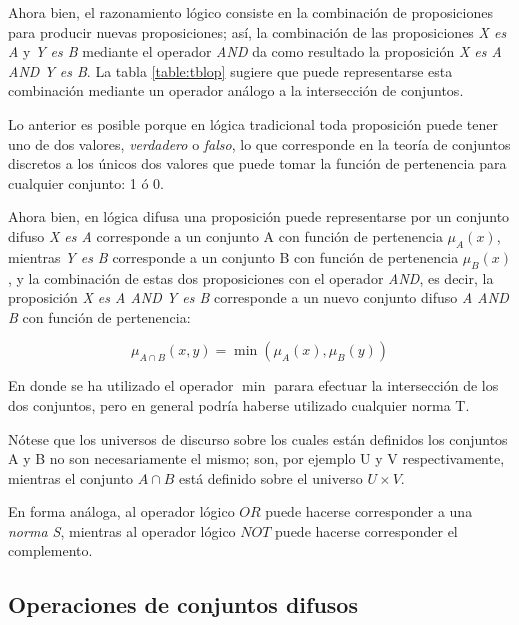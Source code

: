 Ahora bien, el razonamiento lógico consiste en la combinación de proposiciones para producir nuevas proposiciones; así, la combinación de las proposiciones \textit{X es A} y  \textit{Y es B} mediante el operador \textit{AND} da como resultado la proposición \textit{X es A AND Y es B}. La tabla \ref{table:tblop} sugiere que puede representarse esta combinación mediante un operador análogo a la intersección de conjuntos.

Lo anterior es posible porque en lógica tradicional toda proposición puede tener uno de dos valores, \textit{verdadero} o \textit{falso}, lo que corresponde en la teoría de conjuntos discretos a los únicos dos valores que puede tomar la función de pertenencia para cualquier conjunto: 1 ó 0.

Ahora bien, en lógica difusa una proposición puede representarse por un conjunto difuso \textit{X es A} corresponde a un conjunto A con función de pertenencia $\mu_A(x)$, mientras \textit{Y es B} corresponde a un conjunto B con función de pertenencia $\mu_B(x)$, y la combinación de estas dos proposiciones con el operador \textit{AND}, es decir, la proposición \textit{X es A AND Y es B} corresponde a un nuevo conjunto difuso \textit{A AND B} con función de pertenencia:

\begin{displaymath}
\mu_{A \cap B}(x,y) =  \min(\mu_A(x),\mu_B(y))
\end{displaymath}

En donde se ha utilizado el operador $\min$ parara efectuar la intersección de los dos conjuntos, pero en general podría haberse utilizado cualquier norma T.

Nótese que los universos de discurso sobre los cuales están definidos los conjuntos A y B no son necesariamente el mismo; son, por ejemplo U y V respectivamente, mientras el conjunto $A \cap B$ está definido sobre el universo $U \times V$.

En forma análoga, al operador lógico $OR$ puede hacerse corresponder a una \textit{norma S}, mientras al operador lógico $NOT$ puede hacerse corresponder el complemento.









\subsection{Operaciones de conjuntos difusos}

